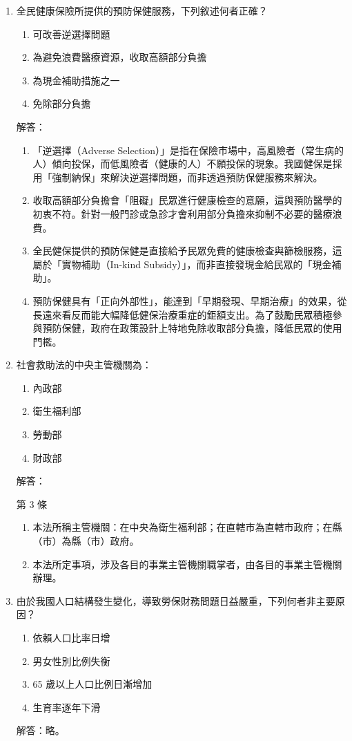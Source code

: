 \documentclass[12pt, a4paper]{article}
\begin{document}
\begin{enumerate}
    \item 全民健康保險所提供的預防保健服務，下列敘述何者正確？
    \begin{enumerate}[label=\Alph*.]
        \item 可改善逆選擇問題
        \item 為避免浪費醫療資源，收取高額部分負擔
        \item 為現金補助措施之一
        \item 免除部分負擔
    \end{enumerate}
    解答：
    \begin{enumerate}[label=\Alph*.]
        \item 「逆選擇（Adverse Selection）」是指在保險市場中，高風險者（常生病的人）傾向投保，而低風險者（健康的人）不願投保的現象。我國健保是採用「強制納保」來解決逆選擇問題，而非透過預防保健服務來解決。
        \item 收取高額部分負擔會「阻礙」民眾進行健康檢查的意願，這與預防醫學的初衷不符。針對一般門診或急診才會利用部分負擔來抑制不必要的醫療浪費。
        \item 全民健保提供的預防保健是直接給予民眾免費的健康檢查與篩檢服務，這屬於「實物補助（In-kind Subsidy）」，而非直接發現金給民眾的「現金補助」。
        \item 預防保健具有「正向外部性」，能達到「早期發現、早期治療」的效果，從長遠來看反而能大幅降低健保治療重症的鉅額支出。為了鼓勵民眾積極參與預防保健，政府在政策設計上特地免除收取部分負擔，降低民眾的使用門檻。
    \end{enumerate}

    \item 社會救助法的中央主管機關為：
    \begin{enumerate}[label=\Alph*.]
        \item 內政部
        \item 衛生福利部
        \item 勞動部
        \item 財政部
    \end{enumerate}
    解答：

    第 3 條
    \begin{enumerate}[1.]
        \item 本法所稱主管機關：在中央為衛生福利部；在直轄市為直轄市政府；在縣（市）為縣（市）政府。
        \item 本法所定事項，涉及各目的事業主管機關職掌者，由各目的事業主管機關辦理。
    \end{enumerate}


    \item 由於我國人口結構發生變化，導致勞保財務問題日益嚴重，下列何者非主要原因？
    \begin{enumerate}[label=\Alph*.]
        \item 依賴人口比率日增
        \item 男女性別比例失衡
        \item 65 歲以上人口比例日漸增加
        \item 生育率逐年下滑
    \end{enumerate}
    解答：略。


\end{enumerate}
\end{document}

